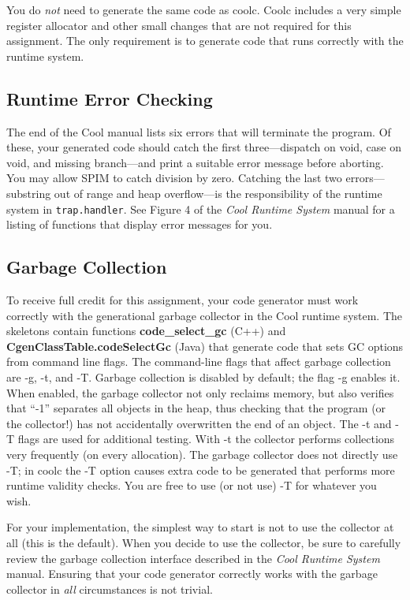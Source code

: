 \documentclass[11pt]{article}
\def\U#1{{\sf{}#1}}
\def\C#1{{\bf{}#1}}
\begin{document}
You do {\em not} need to generate the same code as \U{coolc}.
\U{Coolc} includes a very simple register allocator and other small
changes that are not required for this assignment. The only
requirement is to generate code that runs correctly with the runtime
system.

\subsection{Runtime Error Checking}
The end of the Cool manual lists six errors that will terminate the
program.  Of these, your generated code should catch the first
three---dispatch on void, case on void, and missing branch---and print
a suitable error message before aborting.  You may allow SPIM to catch
division by zero.  Catching the last two errors---substring out of
range and heap overflow---is the responsibility of the runtime system
in {\tt trap.handler}.  See Figure 4 of the \emph{Cool Runtime System}
manual for a listing of functions that display error messages for you.

\subsection{Garbage Collection}

To receive full credit for this assignment, your code generator must
work correctly with the generational garbage collector in the Cool
runtime system.  The skeletons contain functions \C{code\_select\_gc}
(C++) and \C{CgenClassTable.codeSelectGc} (Java) that generate code
that sets GC options from command line flags.  The command-line flags
that affect garbage collection are \U{-g}, \U{-t}, and \U{-T}.
Garbage collection is disabled by default; the flag \U{-g} enables it.
When enabled, the garbage collector not only reclaims memory, but also
verifies that ``-1'' separates all objects in the heap, thus checking
that the program (or the collector!) has not accidentally overwritten
the end of an object.  The \U{-t} and \U{-T} flags are used for
additional testing.  With \U{-t} the collector performs collections
very frequently (on every allocation).  The garbage collector does not
directly use \U{-T}; in \U{coolc} the \U{-T} option causes extra code
to be generated that performs more runtime validity checks.  You are
free to use (or not use) \U{-T} for whatever you wish.

For your implementation, the simplest way to start is not to use the
collector at all (this is the default).  When you decide to use the
collector, be sure to carefully review the garbage collection
interface described in the {\em Cool Runtime System} manual.  Ensuring
that your code generator correctly works with the garbage collector in
{\em all} circumstances is not trivial.
\end{document}
